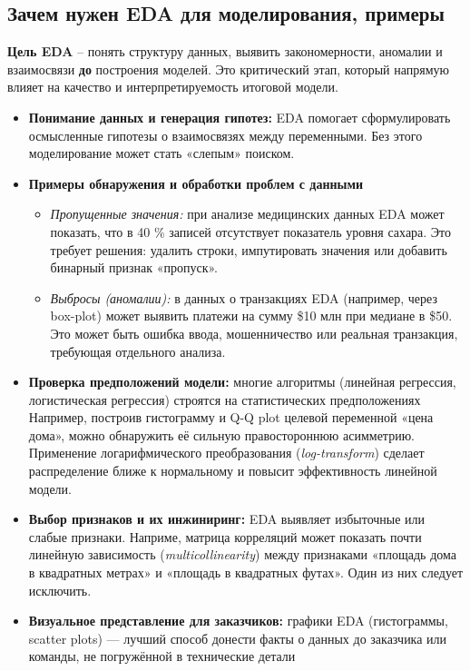 \subsection{Зачем нужен EDA для моделирования, примеры}

\textbf{Цель EDA} -- понять структуру данных, выявить закономерности, аномалии и взаимосвязи \textbf{до}
построения моделей.
Это критический этап, который напрямую влияет на качество и интерпретируемость итоговой модели.

\begin{itemize}
    
    \item \textbf{Понимание данных и генерация гипотез:} EDA помогает сформулировать осмысленные гипотезы о
    взаимосвязях между переменными.
    Без этого моделирование может стать «слепым» поиском.
    
    \item \textbf{Примеры обнаружения и обработки проблем с данными}
    
    \begin{itemize}
        
        \item \textit{Пропущенные значения:} при анализе медицинских данных EDA может показать, что в 40 \% записей
        отсутствует показатель уровня сахара.
        Это требует решения: удалить строки, импутировать значения или добавить бинарный признак «пропуск».
        
        \item \textit{Выбросы (аномалии):} в данных о транзакциях EDA (например, через box-plot) может выявить
        платежи на сумму \$10 млн при медиане в \$50.
        Это может быть ошибка ввода, мошенничество или реальная транзакция, требующая отдельного анализа.
    
    \end{itemize}
    
    \item \textbf{Проверка предположений модели:} многие алгоритмы (линейная регрессия, логистическая регрессия)
    строятся на статистических предположениях
    Например, построив гистограмму и Q-Q plot целевой переменной «цена дома», можно обнаружить её сильную
    правостороннюю асимметрию.
    Применение логарифмического преобразования (\textit{log-transform}) сделает распределение ближе к
    нормальному и повысит эффективность линейной модели.
    
    \item \textbf{Выбор признаков и их инжиниринг:} EDA выявляет избыточные или слабые признаки.
    Наприме, матрица корреляций может показать почти линейную зависимость (\textit{multicollinearity}) между
    признаками «площадь дома в квадратных метрах» и «площадь в квадратных футах».
    Один из них следует исключить.
    
    \item \textbf{Визуальное представление для заказчиков:} графики EDA (гистограммы, scatter plots) — лучший
    способ донести факты о данных до заказчика или команды, не погружённой в технические детали

\end{itemize}


